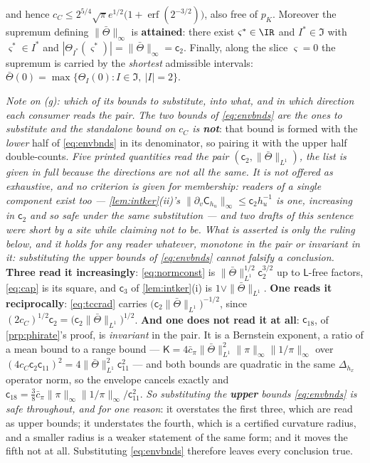 \begin{lemma}
\begin{enumerate}
and hence $c_C\le2^{5/4}\sqrt\pi e^{1/2}\big(1+\operatorname{erf}(2^{-3/2})\big)$, also free of $p_K$.
Moreover the supremum defining $\|\bar\Theta\|_\infty$ is \textbf{attained}: there exist
$\varsigma^\ast\in\IR$ and $I^\ast\in\mathfrak I$ with $\varsigma^\ast\in I^\ast$ and
$|\Theta_{I^\ast}(\varsigma^\ast)|=\|\bar\Theta\|_\infty=\mathsf c_2$. Finally, along the slice
$\varsigma=0$ the supremum is carried by the \emph{shortest} admissible intervals:
$\bar\Theta(0)=\max\{\Theta_I(0):I\in\mathfrak I,\ |I|=2\}$.
\end{enumerate}
\end{lemma}

\noindent\emph{Note on \textup{(g)}: which of its bounds to substitute, into what, and in which
direction each consumer reads the pair.} \emph{The two bounds of \eqref{eq:envbnds} are the ones to
substitute and the standalone bound on $c_C$ is \textbf{not}}: that bound is formed with the
\emph{lower} half of \eqref{eq:envbnds} in its denominator, so pairing it with the upper half
double-counts. \emph{Five printed quantities read the pair $(\mathsf c_2,\|\bar\Theta\|_{L^{1}})$, the
list is given in full because the directions are not all the same. \emph{It is not offered as
exhaustive, and no criterion is given for membership}: readers of a single component exist too ---
\cref{lem:intker}\textup{(ii)}'s $\|\partial_v\mathsf C_{h_u}\|_\infty\le\mathsf c_2h_u^{-1}$ is one,
increasing in $\mathsf c_2$ and so safe under the same substitution --- and two drafts of this sentence
were short by a site while claiming not to be. \emph{What is asserted is only the ruling below, and it
holds for any reader whatever, monotone in the pair or invariant in it}: substituting the upper bounds
of \eqref{eq:envbnds} cannot falsify a conclusion.} \textbf{Three read it increasingly}: \eqref{eq:normconst} is
$\|\bar\Theta\|_{L^{1}}^{1/2}\mathsf c_2^{3/2}$ up to $\mathsf L$-free factors, \eqref{eq:cap} is its
square, and $\mathsf c_3$ of \cref{lem:intker}\textup{(i)} is $1\vee\|\bar\Theta\|_{L^{1}}$.
\textbf{One reads it reciprocally}: \eqref{eq:tccrad} carries
$\big(\mathsf c_2\|\bar\Theta\|_{L^{1}}\big)^{-1/2}$, since
$(2c_C)^{1/2}\mathsf c_2=\big(\mathsf c_2\|\bar\Theta\|_{L^{1}}\big)^{1/2}$.
\textbf{And one does not read it at all}: $\mathsf c_{18}$, of \cref{prp:phirate}'s proof, is
\emph{invariant} in the pair. It is a Bernstein exponent, a ratio of a mean bound to a range bound ---
$\mathsf K=4\bar c_\pi\|\bar\Theta\|_{L^{1}}^{2}\|\pi\|_\infty\|1/\pi\|_\infty$ over
$(4c_C\mathsf c_2\mathsf c_{11})^{2}=4\|\bar\Theta\|_{L^{1}}^{2}\mathsf c_{11}^{2}$ --- and both bounds
are quadratic in the same $\Delta_{h_x}$ operator norm, so the envelope cancels exactly and
$\mathsf c_{18}=\tfrac38\bar c_\pi\|\pi\|_\infty\|1/\pi\|_\infty\big/\mathsf c_{11}^{2}$. \emph{So
substituting the \textbf{upper} bounds \eqref{eq:envbnds} is safe throughout, and for one reason}: it
overstates the first three, which are read as upper bounds; it understates the fourth, which is a
certified curvature radius, and a smaller radius is a weaker statement of the same form; and it moves
the fifth not at all. Substituting \eqref{eq:envbnds} therefore leaves every conclusion true.

